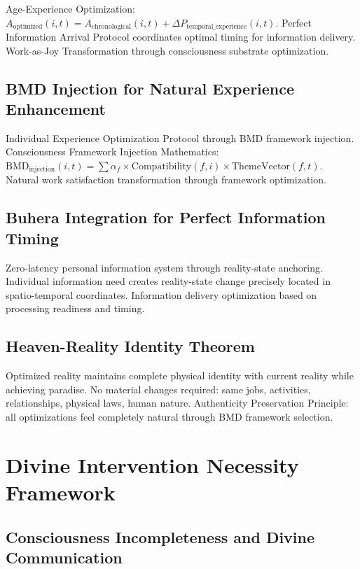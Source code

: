 \documentclass[12pt,a4paper]{article}
\begin{document}
Age-Experience Optimization: $A_{\text{optimized}}(i,t) = A_{\text{chronological}}(i,t) + \Delta P_{\text{temporal\_experience}}(i,t)$. Perfect Information Arrival Protocol coordinates optimal timing for information delivery. Work-as-Joy Transformation through consciousness substrate optimization.

\subsection{BMD Injection for Natural Experience Enhancement}

Individual Experience Optimization Protocol through BMD framework injection. Consciousness Framework Injection Mathematics: $\text{BMD}_{\text{injection}}(i,t) = \sum \alpha_f \times \text{Compatibility}(f,i) \times \text{ThemeVector}(f,t)$. Natural work satisfaction transformation through framework optimization.

\subsection{Buhera Integration for Perfect Information Timing}

Zero-latency personal information system through reality-state anchoring. Individual information need creates reality-state change precisely located in spatio-temporal coordinates. Information delivery optimization based on processing readiness and timing.

\subsection{Heaven-Reality Identity Theorem}

Optimized reality maintains complete physical identity with current reality while achieving paradise. No material changes required: same jobs, activities, relationships, physical laws, human nature. Authenticity Preservation Principle: all optimizations feel completely natural through BMD framework selection.

\section{Divine Intervention Necessity Framework}

\subsection{Consciousness Incompleteness and Divine Communication}
\end{document}
